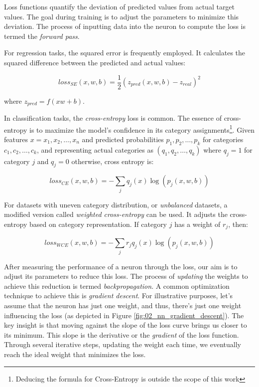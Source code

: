 




\label{02_nn_loss_functions}


Loss functions quantify the deviation of predicted values from actual target values. The goal during training is to adjust the parameters to minimize this deviation. The process of inputting data into the neuron to compute the loss is termed the \emph{forward pass}.

For regression tasks, the squared error is frequently employed. It calculates the squared difference between the predicted and actual values:

\begin{equation}
loss_{SE}(x,w,b) = \dfrac{1}{2} (z_{pred}(x,w,b)-z_{real})^2
\end{equation}

where $z_{pred} = f(xw+b)$.

In classification tasks, the \emph{cross-entropy} loss is common. The essence of cross-entropy is to maximize the model's confidence in its category assignments\footnote{Deducing the formula for Cross-Entropy is outside the scope of this work}. Given features $x = x_1, x_2, \ldots, x_n$ and predicted probabilities $p_1, p_2, \ldots, p_k$ for categories $c_1, c_2, \ldots, c_k$, and representing actual categories as $(q_1, q_2, \ldots, q_k)$ where $q_j =1 $ for category $j$ and $q_j = 0$ otherwise, cross entropy is:

\begin{equation}
loss_{CE}(x,w,b) = - \sum_{j} q_{j}(x) \log{(p_{j}(x,w,b))}
\end{equation}

For datasets with uneven category distribution, or \emph{unbalanced} datasets, a modified version called \emph{weighted cross-entropy} can be used. It adjusts the cross-entropy based on category representation. If category $j$ has a weight of $r_j$, then:

\begin{equation}
loss_{WCE}(x,w,b) = - \sum_{j} r_j q_{j}(x) \log{(p_{j}(x,w,b))}
\end{equation}


\label{02_nn_loss_back_propagation}

After measuring the performance of a neuron through the loss, our aim is to adjust its parameters to reduce this loss. The process of \emph{updating} the weights to achieve this reduction is termed \emph{backpropagation}. A common  optimization technique to achieve this is \emph{gradient descent}. For illustrative purposes, let's assume that the neuron has just one weight, and thus, there's just one weight influencing the loss (as depicted in Figure \ref{fig:02_nn_gradient_descent}). The key insight is that moving against the slope of the loss curve brings us closer to its minimum. This slope is the derivative or the \emph{gradient} of the loss function. Through several iterative steps, updating the weight each time, we eventually reach the ideal weight that minimizes the loss.

